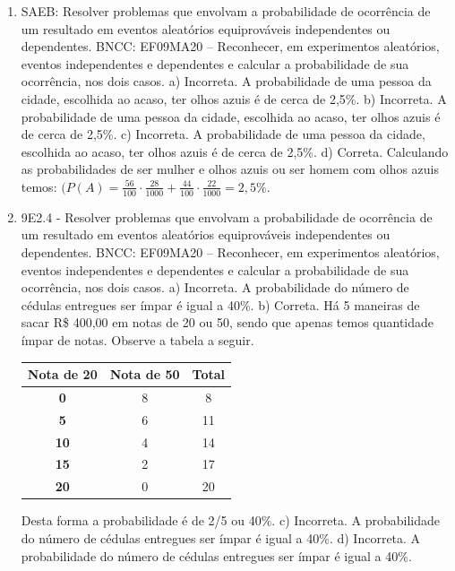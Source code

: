 \begin{enumerate}
\item
SAEB: Resolver problemas que envolvam a probabilidade de
ocorrência de um resultado em eventos aleatórios equiprováveis
independentes ou dependentes. 
BNCC: EF09MA20 -- Reconhecer, em experimentos aleatórios, eventos independentes
e dependentes e calcular a probabilidade de sua ocorrência, nos dois casos.
a) Incorreta. A probabilidade de uma pessoa da cidade, escolhida ao acaso, ter olhos azuis 
é de cerca de 2,5\%.
b) Incorreta. A probabilidade de uma pessoa da cidade, escolhida ao acaso, ter olhos azuis 
é de cerca de 2,5\%.
c) Incorreta. A probabilidade de uma pessoa da cidade, escolhida ao acaso, ter olhos azuis 
é de cerca de 2,5\%.
d) Correta. Calculando as probabilidades de ser mulher e olhos azuis ou ser homem
com olhos azuis temos: $(P(A) = \frac{56}{100} \cdot \frac{28}{1000} + \frac{44}{100} \cdot \frac{22}{1000} = 2,5\%$.

\item
9E2.4 - Resolver problemas que envolvam a probabilidade de
ocorrência de um resultado em eventos aleatórios equiprováveis
independentes ou dependentes. 
BNCC: EF09MA20 -- Reconhecer, em experimentos aleatórios, eventos independentes
e dependentes e calcular a probabilidade de sua ocorrência, nos dois casos. 
a) Incorreta. A probabilidade do número de cédulas entregues ser ímpar é igual a 40\%. 
b) Correta. Há 5 maneiras de sacar R\$ 400,00 em notas de 20 ou 50, sendo que apenas temos quantidade ímpar de notas. Observe a tabela a seguir.

\begin{tabular}{|c|c|c|}
\hline
\textbf{Nota de 20} & \textbf{Nota de 50} & \textbf{Total} \\ \hline
\textbf{0} & 8 & 8 \\ \hline
\textbf{5} & 6 & 11 \\ \hline
\textbf{10} & 4 & 14 \\ \hline
\textbf{15} & 2 & 17 \\ \hline
\textbf{20} & 0 & 20 \\ \hline
\end{tabular}

Desta forma a probabilidade é de 2/5 ou 40\%.
c) Incorreta. A probabilidade do número de cédulas entregues ser ímpar é igual a 40\%. 
d) Incorreta. A probabilidade do número de cédulas entregues ser ímpar é igual a 40\%.


\end{enumerate}
